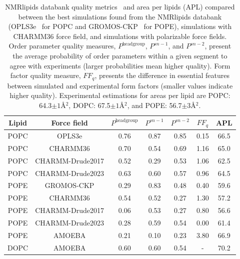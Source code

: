 \documentclass[journal=jacsat,manuscript=article,layout=singlecolumn]{achemso}
\begin{document}
\begin{table}[]
    \centering
    \begin{tabular}{c c c c c c c}
        Lipid & Force field & $P^{\mathrm{headgroup}}$ & $P^{sn-1}$ & $P^{sn-2}$ & $FF_{q}$ & APL \\
        \hline
        POPC & OPLS3e       & 0.76 & 0.87 & 0.85 & 0.15 & 66.5\\
        POPC & CHARMM36     & 0.70 & 0.54 & 0.69 & 1.16 & 65.0\\
        POPC & CHARMM-Drude2017 & 0.52 & 0.29 & 0.53 & 1.06 & 62.5\\
        POPC & CHARMM-Drude2023 & 0.63 & 0.60 & 0.57 & 0.96 & 64.5\\
        \hline
        POPE & GROMOS-CKP & 0.29 & 0.83 & 0.48 & 0.40 & 59.6\\
        POPE & CHARMM36   & 0.54 & 0.52 & 0.27 & 1.30 & 57.2 \\
        POPE & CHARMM-Drude2017 & 0.06 & 0.53 & 0.27 & 0.80 & 56.6  \\
        POPE & CHARMM-Drude2023 & 0.28 & 0.59 & 0.54 & 0.00 & 61.4  \\
        POPE & AMOEBA & 0.21 & 0.10 & 0.23 & 3.80 & 66.9\\
        \hline
        DOPC & AMOEBA & 0.60 & 0.60 & 0.54 & - & 70.2\\
    \end{tabular}
    \caption{NMRlipids databank quality metrics~\cite{Databank} and area per lipids (APL) compared between the best simulations found from the NMRlipids databank (OPLS3e~\cite{roos19} for POPC and GROMOS-CKP~\cite{Chandrasekhar03,kukol09,piggot12} for POPE), simulations with CHARMM36 force field, and simulations with polarizable force fields. Order  parameter quality measures, $P^{\mathrm{headgroup}}$, $P^{sn-1}$, and $P^{sn-2}$, present the average probability of order parameters within a given segment to agree with experiments (larger probabilities mean higher quality). Form factor quality measure, $FF_{q}$, presents the difference in essential features between simulated and experimental form factors (smaller values indicate higher quality). Experimental estimations for areas per lipid are POPC: 64.3$\pm1$\AA$^{2}$\cite{kucerka2011}, DOPC: 67.5$\pm1$\AA$^{2}$\cite{kucerka2008}, and POPE: 56.7$\pm$3\AA$^{2}$\cite{Rickeard2020}.}
    \label{tab:my_label}
\end{table}
\end{document}
